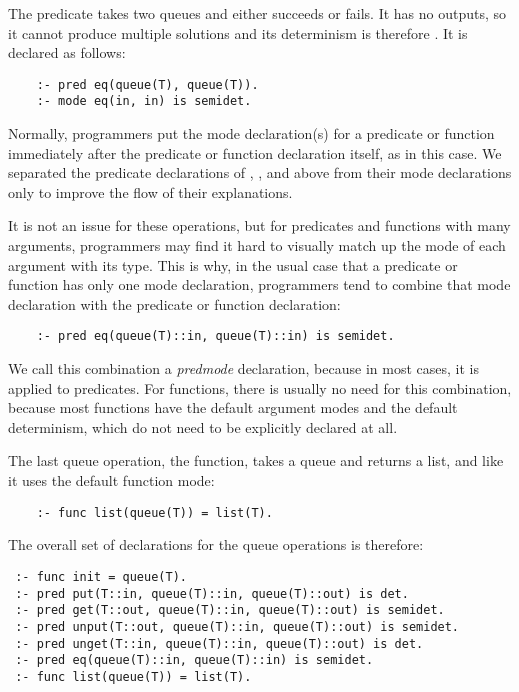 The  predicate takes two queues and either succeeds or fails.
It has no outputs,
so it cannot produce multiple solutions
and its determinism is therefore .
It is declared as follows:
\begin{verbatim}
    :- pred eq(queue(T), queue(T)).
    :- mode eq(in, in) is semidet.
\end{verbatim}

Normally, programmers put the mode declaration(s) for a predicate or function
immediately after the predicate or function declaration itself,
as in this case.
We separated the predicate declarations of
, ,  and  above
from their mode declarations
only to improve the flow of their explanations.

It is not an issue for these operations,
but for predicates and functions with many arguments,
programmers may find it hard to visually match up
the mode of each argument with its type.
This is why,
in the usual case that a predicate or function has only one mode declaration,
programmers tend to combine that mode declaration
with the predicate or function declaration:

\begin{verbatim}
    :- pred eq(queue(T)::in, queue(T)::in) is semidet.
\end{verbatim}

We call this combination a \emph{predmode} declaration,
because in most cases, it is applied to predicates.
For functions, there is usually no need for this combination,
because most functions have
the default argument modes and the default determinism,
which do not need to be explicitly declared at all.

The last queue operation, the  function,
takes a queue and returns a list,
and like  it uses the default function mode:
\begin{verbatim}
    :- func list(queue(T)) = list(T).
\end{verbatim}

\noindent
The overall set of declarations for the queue operations is therefore:
\begin{verbatim}
 :- func init = queue(T).
 :- pred put(T::in, queue(T)::in, queue(T)::out) is det.
 :- pred get(T::out, queue(T)::in, queue(T)::out) is semidet.
 :- pred unput(T::out, queue(T)::in, queue(T)::out) is semidet.
 :- pred unget(T::in, queue(T)::in, queue(T)::out) is det.
 :- pred eq(queue(T)::in, queue(T)::in) is semidet.
 :- func list(queue(T)) = list(T).
\end{verbatim}


